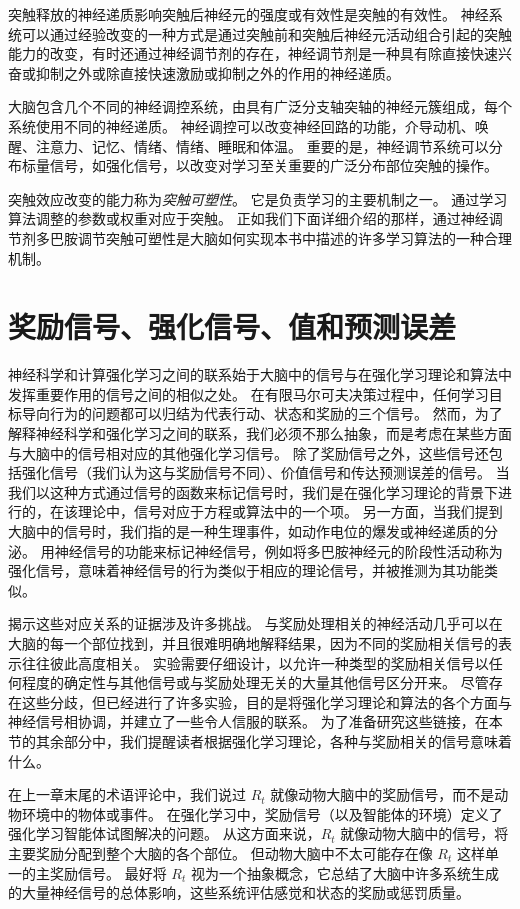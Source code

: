 突触释放的神经递质影响突触后神经元的强度或有效性是突触的有效性。
神经系统可以通过经验改变的一种方式是通过突触前和突触后神经元活动组合引起的突触能力的改变，有时还通过神经调节剂的存在，神经调节剂是一种具有除直接快速兴奋或抑制之外或除直接快速激励或抑制之外的作用的神经递质。


大脑包含几个不同的神经调控系统，由具有广泛分支轴突轴的神经元簇组成，每个系统使用不同的神经递质。
神经调控可以改变神经回路的功能，介导动机、唤醒、注意力、记忆、情绪、情绪、睡眠和体温。
重要的是，神经调节系统可以分布标量信号，如强化信号，以改变对学习至关重要的广泛分布部位突触的操作。


突触效应改变的能力称为\textit{突触可塑性}。
它是负责学习的主要机制之一。
通过学习算法调整的参数或权重对应于突触。
正如我们下面详细介绍的那样，通过神经调节剂多巴胺调节突触可塑性是大脑如何实现本书中描述的许多学习算法的一种合理机制。


\section{奖励信号、强化信号、值和预测误差}

神经科学和计算强化学习之间的联系始于大脑中的信号与在强化学习理论和算法中发挥重要作用的信号之间的相似之处。
在有限马尔可夫决策过程中，任何学习目标导向行为的问题都可以归结为代表行动、状态和奖励的三个信号。
然而，为了解释神经科学和强化学习之间的联系，我们必须不那么抽象，而是考虑在某些方面与大脑中的信号相对应的其他强化学习信号。
除了奖励信号之外，这些信号还包括强化信号（我们认为这与奖励信号不同）、价值信号和传达预测误差的信号。
当我们以这种方式通过信号的函数来标记信号时，我们是在强化学习理论的背景下进行的，在该理论中，信号对应于方程或算法中的一个项。
另一方面，当我们提到大脑中的信号时，我们指的是一种生理事件，如动作电位的爆发或神经递质的分泌。
用神经信号的功能来标记神经信号，例如将多巴胺神经元的阶段性活动称为强化信号，意味着神经信号的行为类似于相应的理论信号，并被推测为其功能类似。



揭示这些对应关系的证据涉及许多挑战。
与奖励处理相关的神经活动几乎可以在大脑的每一个部位找到，并且很难明确地解释结果，因为不同的奖励相关信号的表示往往彼此高度相关。
实验需要仔细设计，以允许一种类型的奖励相关信号以任何程度的确定性与其他信号或与奖励处理无关的大量其他信号区分开来。
尽管存在这些分歧，但已经进行了许多实验，目的是将强化学习理论和算法的各个方面与神经信号相协调，并建立了一些令人信服的联系。
为了准备研究这些链接，在本节的其余部分中，我们提醒读者根据强化学习理论，各种与奖励相关的信号意味着什么。


在上一章末尾的术语评论中，我们说过 $ R_t $ 就像动物大脑中的奖励信号，而不是动物环境中的物体或事件。
在强化学习中，奖励信号（以及智能体的环境）定义了强化学习智能体试图解决的问题。
从这方面来说，$ R_t $ 就像动物大脑中的信号，将主要奖励分配到整个大脑的各个部位。
但动物大脑中不太可能存在像 $ R_t $ 这样单一的主奖励信号。
最好将 $ R_t $ 视为一个抽象概念，它总结了大脑中许多系统生成的大量神经信号的总体影响，这些系统评估感觉和状态的奖励或惩罚质量。


